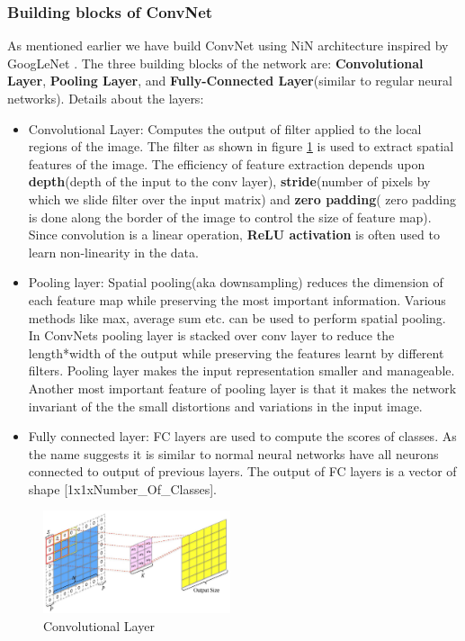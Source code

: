 \documentclass[fleqn,10pt]{SelfArx} %
\begin{document}
\subsubsection{Building blocks of ConvNet}
As mentioned earlier we have build ConvNet using NiN architecture inspired by GoogLeNet . The three building blocks of the network are: \textbf{Convolutional Layer}, \textbf{Pooling Layer}, and \textbf{Fully-Connected Layer}(similar to regular neural networks). Details about the layers:
\begin{itemize}
\itemsep0em
  \item Convolutional Layer: Computes the output of filter applied to the local regions of the image. The filter as shown in figure \ref{fig:conv_layer} is used to extract spatial features of the image. The efficiency of feature extraction depends upon \textbf{depth}(depth of the input to the conv layer), \textbf{stride}(number of pixels by which we slide filter over the input matrix) and \textbf{zero padding}( zero padding is done along the border of the image to control the size of feature map). Since convolution is a linear operation, \textbf{ReLU activation} is often used to learn non-linearity in the data.
  \item Pooling layer: Spatial pooling(aka downsampling) reduces the dimension of each feature map while preserving the most important information. Various methods like max, average sum etc. can be used to perform spatial pooling. In ConvNets pooling layer is stacked over conv layer to reduce the length*width of the output while preserving the features learnt by different filters. Pooling layer makes the input representation smaller and manageable. Another most important feature of pooling layer is that it makes the network invariant of the the small distortions and variations in the input image.
  \item Fully connected layer: FC layers are used to compute the scores of classes. As the name suggests it is similar to normal neural networks have all neurons connected to output of previous layers. The output of FC layers is a vector of shape [1x1xNumber\_Of\_Classes].
\end{itemize}

\begin{figure}[ht]\centering
\includegraphics[width=0.49\textwidth]{conv_layer}
\caption{Convolutional Layer}
\label{fig:conv_layer}
\end{figure}
\end{document}
